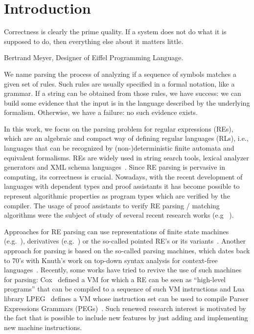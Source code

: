 \documentclass[oneside,12pt]{scrbook}
\theoremstyle{definition}
\theoremstyle{plain}
\theoremstyle{definition}
\begin{document}

\mainmatter

\chapter{Introduction}\label{chapter:introduction}

\epigraph{Correctness is clearly the prime quality. If a system does
  not do what it is supposed to do, then everything else about it
  matters little.}{Bertrand Meyer, Designer of Eiffel Programming Language.}


We name parsing the process of analyzing if a sequence of symbols matches a given set of rules.
Such rules are usually specified in a formal notation, like a grammar. If a string can be obtained
from those rules, we have success: we can build some evidence that the input is in the language
described by the underlying formalism. Otherwise, we have a failure: no such evidence exists.

In this work, we focus on the parsing problem for regular expressions (REs), which are an algebraic
and compact way of defining regular languages (RLs), i.e., languages that can be recognized by
(non-)deterministic finite automata and equivalent formalisms. REs are widely used in string search
tools, lexical analyzer generators and XML schema languages~\cite{Frisch2004}. Since RE parsing
is pervasive in computing, its correctness is crucial. Nowadays, with the recent
development of languages with dependent types and proof assistants it has become
possible to represent algorithmic properties as program types which are verified
by the compiler. The usage of proof assistants to verify RE parsing / matching algorithms
were the subject of study of several recent research works (e.g ~\cite{Firsov13,Ribeiro2017,Lopes2016,Asperti10}).

Approaches for RE parsing can use representations of finite state machines (e.g.~\cite{Firsov13}),
derivatives (e.g.~\cite{Ribeiro2017,Lopes2018,Lopes2016}) or the so-called pointed RE's or its
variants~\cite{Asperti10,Fischer2010}. Another approach for parsing is based on the so-called
parsing machines, which dates back to 70's with Knuth's work
on top-down syntax analysis for context-free languages~\cite{Knuth71}. Recently, some works
have tried to revive the use of such machines for parsing: Cox~\cite{Cox2009} defined a VM
for which a RE can be seen as ``high-level programs'' that can be compiled to a sequence of
such VM instructions and Lua library LPEG~\cite{Ierusalimschy2009} defines a VM whose instruction
set can be used to compile Parser Expressions Grammars (PEGs)~\cite{Ford04}. Such renewed research
interest is motivated by the fact that is possible to include new features by just adding and
implementing new machine instructions.
\end{document}
